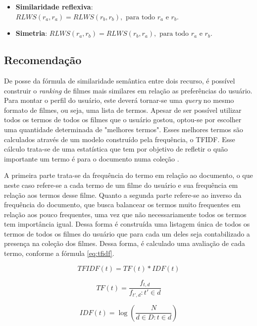 \begin{itemize}
	\item{\textbf{Similaridade reflexiva}: $RLWS(r_a, r_a) = RLWS(r_b, r_b), \text{ para todo } r_a \text{ e } r_b$.}
	\item{\textbf{Simetria}: $RLWS(r_a, r_b) = RLWS(r_b, r_a), \text{ para todo } r_a \text{ e } r_b$.}
\end{itemize}

\subsection{Recomendação}

De posse da fórmula de similaridade semântica entre dois recurso, é possível construir o \textit{ranking} de filmes mais similares em relação as preferências do usuário. Para montar o perfil do usuário, este deverá tornar-se uma \textit{query} no mesmo formato de filmes, ou seja, uma lista de termos. Apesar de ser possível utilizar todos os termos de todos os filmes que o usuário gostou, optou-se por escolher uma quantidade determinada de "melhores termos". Esses melhores termos são calculados através de um modelo construído pela frequência, o \ac{TFIDF}. Esse cálculo trata-se de uma estatística que tem por objetivo de refletir o quão importante um termo é para o documento numa coleção \citep{rajaraman_ullman_2011}. 

A primeira parte trata-se da frequência do termo em relação ao documento, o que neste caso refere-se a cada termo de um filme do usuário e sua frequência em relação aos termos desse filme. Quanto a segunda parte refere-se ao inverso da frequência do documento, que busca balancear  os termos muito frequentes em relação aos pouco frequentes, uma vez que não necessariamente todos os termos tem importância igual. Dessa forma é construída uma listagem única de todos os termos de todos os filmes do usuário que para cada um deles seja contabilizado a presença na coleção dos filmes. Dessa forma, é calculado uma avaliação de cada termo, conforme a fórmula {\ref{eq:tfidf}}.

\begin{equation}
	TFIDF(t) = TF(t) * IDF(t)
\label{eq:tfidf}
\end{equation}

\begin{equation}
	TF(t) = \frac{f_{t,d}}{f_{t',d} : t' \in d}
\label{eq:tf}
\end{equation}

\begin{equation}
	IDF(t) = \log (\frac{N}{d \in D : t \in d})
\label{eq:idf}
\end{equation}

